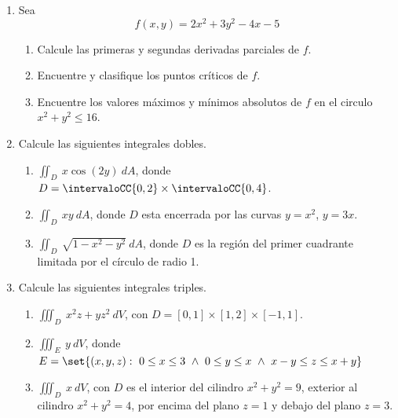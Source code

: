 \begin{frame}
  \begin{enumerate}
    \item Sea
      $$f(x,y) = 2x^2+3y^2-4x-5$$
      \begin{enumerate}
        \item Calcule las primeras y segundas derivadas parciales de $f$.
        \vspace{2mm}
        \item Encuentre y clasifique los puntos críticos de $f$.
        \vspace{2mm}
        \item Encuentre los valores máximos y mínimos absolutos de $f$ en el circulo $x^2+y^2\leq 16$.
      \end{enumerate}
    \vspace{5mm}
    \item Calcule las siguientes integrales dobles.
      \begin{enumerate}
        \item $\displaystyle\iint_{D}\ x\cos(2y)\ dA$, donde $D = \intervaloCC{0,2}\times\intervaloCC{0,4}$.
        \vspace{2mm}
        \item $\displaystyle\iint_{D}\ xy\ dA$, donde $D$ esta encerrada por las curvas $y=x^2$, $y=3x$.
        \vspace{2mm}
        \item $\displaystyle\iint_{D}\ \sqrt{1-x^2-y^2}\ dA$, donde $D$ es la región del primer cuadrante limitada por el círculo de radio 1.
      \end{enumerate}
    \vspace{5mm}
  \end{enumerate}
\end{frame}

\begin{frame}
  \begin{enumerate}
    \setcounter{enumi}{2}
    \item Calcule las siguientes integrales triples.
      \begin{enumerate}
        \item $\displaystyle\iiint_D\ x^2z+yz^2\ dV$, con $D=[0,1]\times[1,2]\times[-1,1]$.
        \vspace{2mm}
        \item $\displaystyle\iiint_E\ y\ dV$, donde $E=\set{(x,y,z):\ 0\leq x\leq 3\ \wedge\ 0\leq y\leq x\ \wedge\ x-y\leq z\leq x+y}$
        \vspace{2mm}
        \item $\displaystyle\iiint_D\ x\ dV$, con $D$ es el interior del cilindro $x^2+y^2=9$, exterior al cilindro $x^2+y^2=4$, por encima del plano $z=1$ y debajo del plano $z=3$.
      \end{enumerate}
  \end{enumerate}
\end{frame}